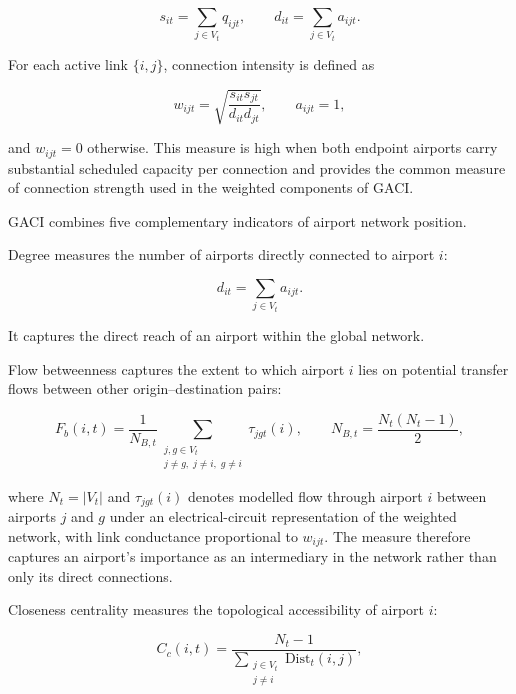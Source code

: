 \documentclass[12pt]{article}
\begin{document}
\begin{equation}
s_{it}
=
\sum_{j\in V_t} q_{ijt},
\qquad
d_{it}
=
\sum_{j\in V_t} a_{ijt}.
\label{eq:nature_9}
\end{equation}

For each active link $\{i,j\}$, connection intensity is defined as

\begin{equation}
w_{ijt}
=
\sqrt{
\frac{s_{it}s_{jt}}
{d_{it}d_{jt}}
},
\qquad
a_{ijt}=1,
\label{eq:nature_10}
\end{equation}

and $w_{ijt}=0$ otherwise. This measure is high when both endpoint airports carry substantial scheduled capacity per connection and provides the common measure of connection strength used in the weighted components of GACI.

GACI combines five complementary indicators of airport network position.

Degree measures the number of airports directly connected to airport $i$:

\begin{equation}
d_{it}
=
\sum_{j\in V_t} a_{ijt}.
\label{eq:nature_11}
\end{equation}

It captures the direct reach of an airport within the global network.

Flow betweenness captures the extent to which airport $i$ lies on potential transfer flows between other origin--destination pairs:

\begin{equation}
F_b(i,t)
=
\frac{1}{N_{B,t}}
\sum_{\substack{j,g\in V_t\\
j\neq g,\; j\neq i,\; g\neq i}}
\tau_{jgt}(i),
\qquad
N_{B,t}
=
\frac{N_t(N_t-1)}{2},
\label{eq:nature_12}
\end{equation}

where $N_t=|V_t|$ and $\tau_{jgt}(i)$ denotes modelled flow through airport $i$ between airports $j$ and $g$ under an electrical-circuit representation of the weighted network, with link conductance proportional to $w_{ijt}$. The measure therefore captures an airport's importance as an intermediary in the network rather than only its direct connections.

Closeness centrality measures the topological accessibility of airport $i$:

\begin{equation}
C_c(i,t)
=
\frac{N_t-1}
{\displaystyle
\sum_{\substack{j\in V_t\\j\neq i}}
\mathrm{Dist}_t(i,j)
},
\label{eq:nature_13}
\end{equation}
\end{document}
